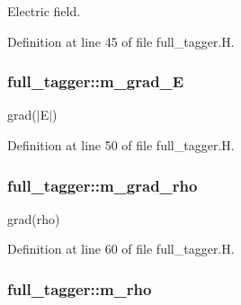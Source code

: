 Electric field. 



Definition at line 45 of file full\+\_\+tagger.\+H.

\subsubsection[{\texorpdfstring{m\+\_\+grad\+\_\+E}{m_grad_E}}]{ full\+\_\+tagger\+::m\+\_\+grad\+\_\+E\hspace{0.3cm}{\ttfamily [protected]}}\hypertarget{classfull__tagger_a47a6b3021e4ceb00360c496881dbc978}{}\label{classfull__tagger_a47a6b3021e4ceb00360c496881dbc978}


grad($\vert$\+E$\vert$) 



Definition at line 50 of file full\+\_\+tagger.\+H.

\subsubsection[{\texorpdfstring{m\+\_\+grad\+\_\+rho}{m_grad_rho}}]{ full\+\_\+tagger\+::m\+\_\+grad\+\_\+rho\hspace{0.3cm}{\ttfamily [protected]}}\hypertarget{classfull__tagger_aefcdba0874e19b2a38ee3c3bb5d2c63d}{}\label{classfull__tagger_aefcdba0874e19b2a38ee3c3bb5d2c63d}


grad(rho) 



Definition at line 60 of file full\+\_\+tagger.\+H.

\subsubsection[{\texorpdfstring{m\+\_\+rho}{m_rho}}]{ full\+\_\+tagger\+::m\+\_\+rho\hspace{0.3cm}{\ttfamily [protected]}}\hypertarget{classfull__tagger_ab0ec280ebb487d3b66407f1048a09055}{}\label{classfull__tagger_ab0ec280ebb487d3b66407f1048a09055}


